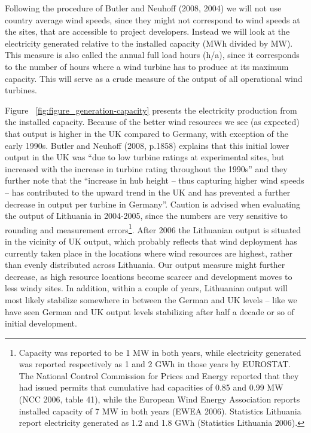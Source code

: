 \documentclass[a4paper, 12pt]{article}
\begin{document}
Following the procedure of Butler and Neuhoff (2008, 2004) we will not use country average wind speeds, since they might not correspond to wind speeds at the sites, that are accessible to project developers. Instead we will look at the electricity generated relative to the installed capacity (MWh divided by MW). This measure is also called the annual full load hours (h/a), since it corresponds to the number of hours where a wind turbine has to produce at its maximum capacity. This will serve as a crude measure of the output of all operational wind turbines. 

Figure ~\ref{fig:figure_generation-capacity} presents the electricity production from the installed capacity. Because of the better wind resources we see (as expected) that output is higher in the UK compared to Germany, with exception of the early 1990s. Butler and Neuhoff (2008, p.1858) explains that this initial lower output in the UK was ``due to low turbine ratings at experimental sites, but increased with the increase in turbine rating throughout the 1990s'' and they further note that the ``increase in hub height – thus capturing higher wind speeds – has contributed to the upward trend in the UK and has prevented a further decrease in output per turbine in Germany''. Caution is advised when evaluating the output of Lithuania in 2004-2005, since the numbers are very sensitive to rounding and measurement errors\footnote{Capacity was reported to be 1 MW in both years, while electricity generated was reported respectively as 1 and 2 GWh in those years by EUROSTAT. The National Control Commission for Prices and Energy reported that they had issued permits that cumulative had capacities of 0.85 and 0.99 MW (NCC 2006, table 41), while the European Wind Energy Association reports installed capacity of 7 MW in both years (EWEA 2006). Statistics Lithuania report electricity generated as 1.2 and 1.8 GWh (Statistics Lithuania 2006).}. After 2006 the Lithuanian output is situated in the vicinity of UK output, which probably reflects that wind deployment has currently taken place in the locations where wind resources are highest, rather than evenly distributed across Lithuania. Our output measure might further decrease, as high resource locations become scarcer and development moves to less windy sites. In addition, within a couple of years, Lithuanian output will most likely stabilize somewhere in between the German and UK levels – like we have seen German and UK output levels stabilizing after half a decade or so of initial development. 
\end{document}
